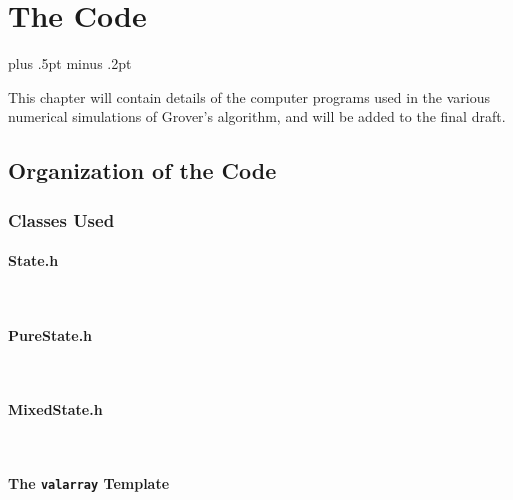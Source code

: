 

\chapter{The Code}
\label{chap:code}

\baselineskip=15.5pt plus .5pt minus .2pt

This chapter will contain details of the computer programs used
in the various numerical simulations of Grover's algorithm, and
will be added to the final draft.

\section{Organization of the Code}

\subsection{Classes Used}

\subsubsection{State.h}

\texttt{
\sloppy
\small
}

\subsubsection{PureState.h}

\texttt{
\sloppy
\small
}

\subsubsection{MixedState.h}

\texttt{
\sloppy
\small
}


\subsubsection{The \texttt{valarray} Template}


